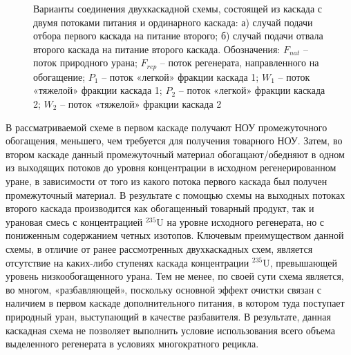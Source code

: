 \begin{figure}[ht]
  \caption{Варианты соединения двухкаскадной схемы, состоящей из каскада с двумя потоками питания и ординарного каскада: а) случай подачи отбора первого каскада на питание второго; б) случай подачи отвала второго каскада на питание второго каскада. Обозначения: $F_{nat}$ – поток природного урана; $F_{rep}$ – поток регенерата, направленного на обогащение; $P_1$ – поток «легкой» фракции каскада 1; $W_1$ – поток «тяжелой» фракции каскада 1; $P_2$ – поток «легкой» фракции каскада 2; $W_2$ – поток «тяжелой» фракции каскада 2}\label{f_2double}
\end{figure}

В рассматриваемой схеме в первом каскаде получают НОУ промежуточного обогащения, меньшего, чем требуется для получения товарного НОУ. Затем, во втором каскаде данный промежуточный материал обогащают/обедняют в одном из выходящих потоков до уровня концентрации в исходном регенерированном уране, в зависимости от того из какого потока первого каскада был получен промежуточный материал. В результате с помощью схемы на выходных потоках второго каскада производится как обогащенный товарный продукт, так и урановая смесь с концентрацией $^{235}$U на уровне исходного регенерата, но с пониженным содержанием четных изотопов. Ключевым преимуществом данной схемы, в отличие от ранее рассмотренных двухкаскадных схем, является отсутствие на каких-либо ступенях каскада концентрации $^{235}$U, превышающей уровень низкообогащенного урана.
Тем не менее, по своей сути схема является, во многом, «разбавляющей», поскольку основной эффект очистки связан с наличием в первом каскаде дополнительного питания, в котором туда поступает природный уран, выступающий в качестве разбавителя. В результате, данная каскадная схема не позволяет выполнить условие использования всего объема выделенного регенерата в условиях многократного рецикла.



